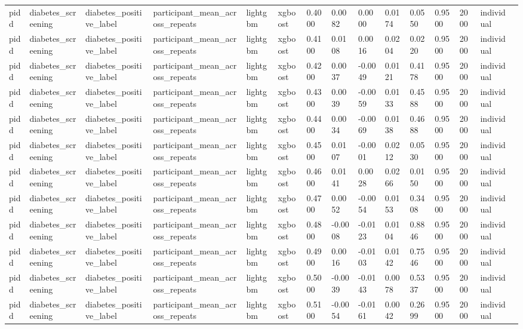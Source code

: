 \begin{tabular}{lllllllllllllll}
pidd & diabetes\_screening & diabetes\_positive\_label & participant\_mean\_across\_repeats & lightgbm & xgboost & 0.4000 & 0.0082 & 0.0000 & 0.0174 & 0.0550 & 0.9500 & 2000 & individual &  \\
pidd & diabetes\_screening & diabetes\_positive\_label & participant\_mean\_across\_repeats & lightgbm & xgboost & 0.4100 & 0.0108 & 0.0016 & 0.0204 & 0.0220 & 0.9500 & 2000 & individual &  \\
pidd & diabetes\_screening & diabetes\_positive\_label & participant\_mean\_across\_repeats & lightgbm & xgboost & 0.4200 & 0.0037 & -0.0049 & 0.0121 & 0.4178 & 0.9500 & 2000 & individual &  \\
pidd & diabetes\_screening & diabetes\_positive\_label & participant\_mean\_across\_repeats & lightgbm & xgboost & 0.4300 & 0.0039 & -0.0059 & 0.0133 & 0.4588 & 0.9500 & 2000 & individual &  \\
pidd & diabetes\_screening & diabetes\_positive\_label & participant\_mean\_across\_repeats & lightgbm & xgboost & 0.4400 & 0.0034 & -0.0069 & 0.0138 & 0.4688 & 0.9500 & 2000 & individual &  \\
pidd & diabetes\_screening & diabetes\_positive\_label & participant\_mean\_across\_repeats & lightgbm & xgboost & 0.4500 & 0.0107 & -0.0001 & 0.0212 & 0.0530 & 0.9500 & 2000 & individual &  \\
pidd & diabetes\_screening & diabetes\_positive\_label & participant\_mean\_across\_repeats & lightgbm & xgboost & 0.4600 & 0.0141 & 0.0028 & 0.0266 & 0.0150 & 0.9500 & 2000 & individual &  \\
pidd & diabetes\_screening & diabetes\_positive\_label & participant\_mean\_across\_repeats & lightgbm & xgboost & 0.4700 & 0.0052 & -0.0054 & 0.0153 & 0.3408 & 0.9500 & 2000 & individual &  \\
pidd & diabetes\_screening & diabetes\_positive\_label & participant\_mean\_across\_repeats & lightgbm & xgboost & 0.4800 & -0.0008 & -0.0123 & 0.0104 & 0.8846 & 0.9500 & 2000 & individual &  \\
pidd & diabetes\_screening & diabetes\_positive\_label & participant\_mean\_across\_repeats & lightgbm & xgboost & 0.4900 & 0.0016 & -0.0103 & 0.0142 & 0.7546 & 0.9500 & 2000 & individual &  \\
pidd & diabetes\_screening & diabetes\_positive\_label & participant\_mean\_across\_repeats & lightgbm & xgboost & 0.5000 & -0.0039 & -0.0143 & 0.0078 & 0.5337 & 0.9500 & 2000 & individual &  \\
pidd & diabetes\_screening & diabetes\_positive\_label & participant\_mean\_across\_repeats & lightgbm & xgboost & 0.5100 & -0.0054 & -0.0161 & 0.0042 & 0.2699 & 0.9500 & 2000 & individual &  \\

\end{tabular}
